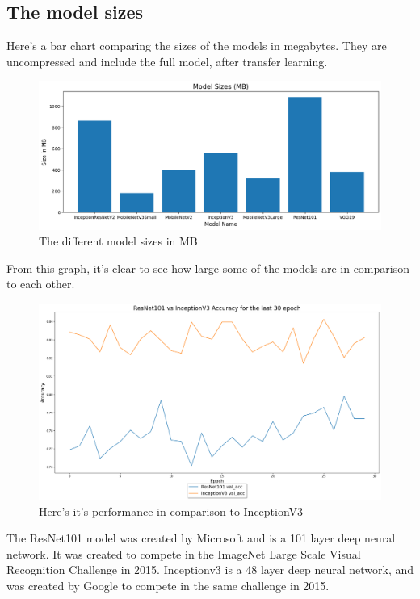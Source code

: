 \documentclass[]{final_report}
\begin{document}
\pagebreak

\subsection{The model sizes}

Here's a bar chart comparing the sizes of the models in megabytes.
They are uncompressed and include the full model, after transfer learning.

\begin{figure}[ht!]
  \centering
  \includegraphics[width=120mm]{images/model-sizes.png}
  \caption{The different model sizes in MB}
\end{figure}

From this graph, it's clear to see how large some of the models are in comparison to each other.

\begin{figure}[ht!]
  \centering
  \includegraphics[width=120mm]{images/ResNet101-vs-Inceptionv3.png}
  \caption{Here's it's performance in comparison to InceptionV3}
\end{figure}

The ResNet101\cite{DBLP:journals/corr/HeZRS15} model was created by Microsoft and is a 101 layer deep neural network.
It was created to compete in the ImageNet Large Scale Visual Recognition Challenge\cite{ILSVRC} in 2015.
Inceptionv3 is a 48 layer deep neural network, and was created by Google to compete in the same challenge in 2015.
\end{document}
